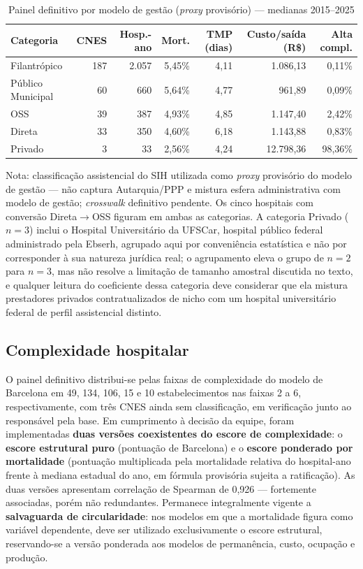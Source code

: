 \begin{table}[htbp]
\centering
\caption{Painel definitivo por modelo de gestão (\emph{proxy} provisório) --- medianas 2015--2025}
\label{tab:gestao}
\begin{tabular}{lrrrrrr}
\toprule
Categoria & CNES & Hosp.-ano & Mort. & TMP (dias) & Custo/saída (R\$) & Alta compl. \\
\midrule
Filantrópico      & 187 & 2.057 & 5,45\% & 4,11 & 1.086,13 & 0,11\% \\
Público Municipal &  60 &   660 & 5,64\% & 4,77 &   961,89 & 0,09\% \\
OSS               &  39 &   387 & 4,93\% & 4,85 & 1.147,40 & 2,42\% \\
Direta            &  33 &   350 & 4,60\% & 6,18 & 1.143,88 & 0,83\% \\
Privado           &   3 &    33 & 2,56\% & 4,24 & 12.798,36 & 98,36\% \\
\bottomrule
\end{tabular}

\smallskip
{\footnotesize Nota: classificação assistencial do SIH utilizada como \emph{proxy} provisório do modelo de gestão --- não captura Autarquia/PPP e mistura esfera administrativa com modelo de gestão; \emph{crosswalk} definitivo pendente. Os cinco hospitais com conversão Direta$\to$OSS figuram em ambas as categorias. A categoria Privado ($n=3$) inclui o Hospital Universitário da UFSCar, hospital público federal administrado pela Ebserh, agrupado aqui por conveniência estatística e não por corresponder à sua natureza jurídica real; o agrupamento eleva o grupo de $n=2$ para $n=3$, mas não resolve a limitação de tamanho amostral discutida no texto, e qualquer leitura do coeficiente dessa categoria deve considerar que ela mistura prestadores privados contratualizados de nicho com um hospital universitário federal de perfil assistencial distinto.}
\end{table}

\subsection*{Complexidade hospitalar}

O painel definitivo distribui-se pelas faixas de complexidade do modelo de Barcelona em 49, 134, 106, 15 e 10 estabelecimentos nas faixas 2 a 6, respectivamente, com três CNES ainda sem classificação, em verificação junto ao responsável pela base. Em cumprimento à decisão da equipe, foram implementadas \textbf{duas versões coexistentes do escore de complexidade}: o \textbf{escore estrutural puro} (pontuação de Barcelona) e o \textbf{escore ponderado por mortalidade} (pontuação multiplicada pela mortalidade relativa do hospital-ano frente à mediana estadual do ano, em fórmula provisória sujeita a ratificação). As duas versões apresentam correlação de Spearman de 0,926 --- fortemente associadas, porém não redundantes. Permanece integralmente vigente a \textbf{salvaguarda de circularidade}: nos modelos em que a mortalidade figura como variável dependente, deve ser utilizado exclusivamente o escore estrutural, reservando-se a versão ponderada aos modelos de permanência, custo, ocupação e produção.

